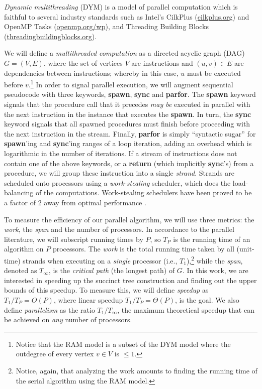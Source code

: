 {\em Dynamic multithreading} (DYM) \cite[Chapter 27]{Cormen2009} is a
model of parallel computation which is faithful to several industry standards
such as Intel's CilkPlus (\url{cilkplus.org}) and OpenMP Tasks
(\url{openmp.org/wp}), and Threading Building
Blocks (\url{threadingbuildingblocks.org}).

We will define a {\em multithreaded computation} as a directed acyclic
graph (DAG) $G=(V,E)$, where the set of vertices $V$ are instructions
and $(u,v) \in E$ are dependencies between instructions; whereby in
this case, $u$ must be executed before $v$.\footnote{Notice that the
  RAM model is a subset of the DYM model where the outdegree of every
  vertex $v \in V$ is $\leq 1$.} In order to signal parallel
execution, we will augment sequential pseudocode with three keywords,
{\bf spawn}, {\bf sync} and {\bf parfor}. The {\bf spawn} keyword
signals that the procedure call that it precedes {\em may be} executed
in parallel with the next instruction in the instance that executes
the {\bf spawn}. In turn, the {\bf sync} keyword signals that all
spawned procedures must finish before proceeding with the next
instruction in the stream. Finally, {\bf parfor} is simply ``syntactic
sugar'' for {\bf spawn}'ing and {\bf sync}'ing ranges of a loop
iteration, adding an overhead which is logarithmic in the number of
iterations. If a stream of instructions does not contain one of the
above keywords, or a {\bf return} (which implicitly {\bf sync}'s) from
a procedure, we will group these instruction into a single {\em
  strand}. Strands are scheduled onto processors using a {\em
  work-stealing} scheduler, which does the load-balancing of the
computations. Work-stealing schedulers have been proved to be a factor
of 2 away from optimal performance
\cite{Blumofe:1999:SMC:324133.324234}.

To measure the efficiency of our parallel algorithm, we
will use three metrics: the {\em work}, the {\em span} and the number
of processors. In accordance to the parallel literature, we will
subscript running times by $P$, so $T_P$ is the running time of an
algorithm on $P$ processors. The {\em work} is the total running time
taken by all (unit-time) strands when executing on a {\em single}
processor (i.e., $T_1$),\footnote{Notice, again, that analyzing the
  work amounts to finding the running time of the serial algorithm
  using the RAM model.} while the {\em span}, denoted as $T_\infty$,
is the {\em critical path} (the longest path) of $G$. In this work,
we are interested in speeding up the succinct tree construction and finding
out the upper bounds of this speedup. To measure this, we will define
{\em speedup} as $T_1/T_P = O(P)$, where linear speedup $T_1/T_P =
\Theta(P)$, is the goal. We also define {\em parallelism} as the ratio
$T_1/T_{\infty}$, the maximum theoretical speedup that can be achieved
on {\em any} number of processors.